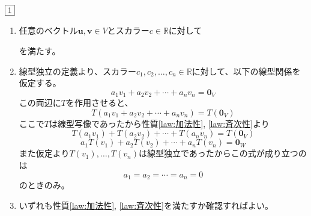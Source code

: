 \documentclass[dvipdfmx]{jsreport}
\newcommand{\R}{\mathbb{R}}
\newcounter{num}[section]
\begin{document}
\begin{answer} %
	$\fbox{1}$
\begin{enumerate}
	\item 任意のベクトル$\bm{u}, \bm{v}\in V$とスカラー$c\in \R$に対して
	を満たす。
	\item 線型独立の定義より、スカラー$c_1, c_2, \ldots, c_n\in \R$に対して、以下の線型関係を仮定する。
\begin{equation*}
	a_1v_1+ a_2v_2+ \cdots+ a_nv_n= \bm{0}_V
\end{equation*}
	この両辺に$T$を作用させると、
\begin{equation*}
	T(a_1v_1+ a_2v_2+ \cdots+ a_nv_n)= T(\bm{0}_V)
\end{equation*}
	ここで$T$は線型写像であったから性質\ref{law:加法性}, \ref{law:斉次性}より
\begin{equation*}
	T(a_1v_1)+ T(a_2v_2)+ \cdots+ T(a_nv_n)= T(\bm{0}_V)
\end{equation*}
\begin{equation*}
	a_1T(v_1)+ a_2T(v_2)+ \cdots+ a_nT(v_n)= \bm{0}_W
\end{equation*}
	また仮定より$T(v_1), \ldots, T(v_n)$は線型独立であったからこの式が成り立つのは
\begin{equation*}
	a_1= a_2= \cdots= a_n= 0
\end{equation*}
	のときのみ。
	\item いずれも性質\ref{law:加法性}, \ref{law:斉次性}を満たすか確認すればよい。
\end{enumerate}
\end{answer}
\end{document}

